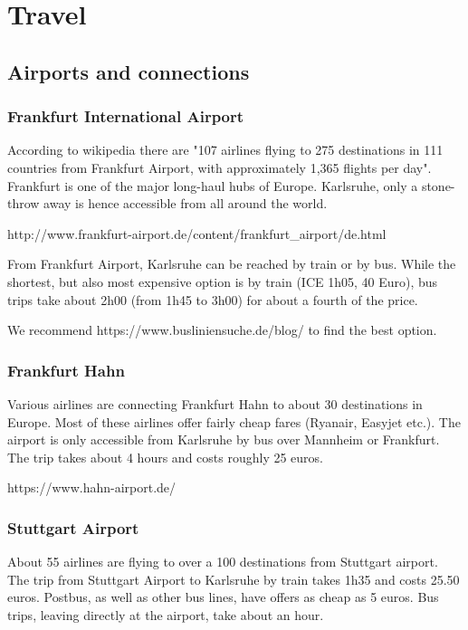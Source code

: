 \section{Travel}

\subsection{Airports and connections}

\subsubsection{Frankfurt International Airport}

According to wikipedia there are "107 airlines flying to 275 destinations in 111 countries from Frankfurt Airport, with approximately 1,365 flights per day". Frankfurt is one of the major long-haul hubs of Europe. Karlsruhe, only a stone-throw away is hence accessible from all around the world.

http://www.frankfurt-airport.de/content/frankfurt_airport/de.html

From Frankfurt Airport, Karlsruhe can be reached by train or by bus. While the shortest, but also most expensive option is by train (ICE 1h05, 40 Euro), bus trips take about 2h00 (from 1h45 to 3h00) for about a fourth of the price.

We recommend https://www.busliniensuche.de/blog/ to find the best option.

\subsubsection{Frankfurt Hahn}

Various airlines are connecting Frankfurt Hahn to about 30 destinations in Europe. Most of these airlines offer fairly cheap fares (Ryanair, Easyjet etc.). The airport is only accessible from Karlsruhe by bus over Mannheim or Frankfurt. The trip takes about 4 hours and costs roughly 25 euros.

https://www.hahn-airport.de/

\subsubsection{Stuttgart Airport}

About 55 airlines are flying to over a 100 destinations from Stuttgart airport. The trip from Stuttgart Airport to Karlsruhe by train takes 1h35 and costs 25.50 euros. Postbus, as well as other bus lines, have offers as cheap as 5 euros. Bus trips, leaving directly at the airport, take about an hour. 

